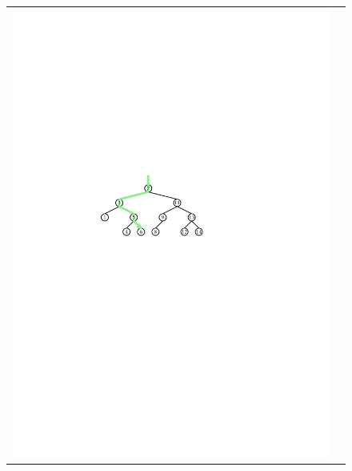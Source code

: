 \begin{figure}
  \begin{center}
    \begin{tabular}{cc}
    \includegraphics[width=\HalfScaleIfNeeded]{figs/bst-example-2} &

\end{tabular}
\end{center}
\end{figure}
